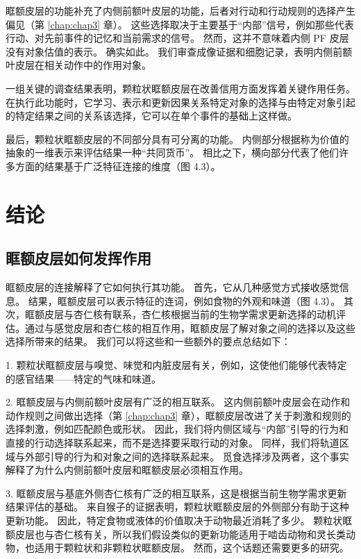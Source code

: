 眶额皮层的功能补充了内侧前额叶皮层的功能，后者对行动和行动规则的选择产生偏见（第 \ref{chap:chap3} 章）。
这些选择取决于主要基于“内部”信号，例如那些代表行动、对先前事件的记忆和当前需求的信号。
然而，这并不意味着内侧 PF 皮层没有对象估值的表示。
确实如此。 我们审查成像证据和细胞记录，表明内侧前额叶皮层在相关动作中的作用对象。\par


一组关键的调查结果表明，颗粒状眶额皮层在改善信用方面发挥着关键作用任务。
在执行此功能时，它学习、表示和更新因果关系特定对象的选择与由特定对象引起的特定结果之间的关系该选择，它可以在单个事件的基础上这样做。\par


最后，颗粒状眶额皮层的不同部分具有可分离的功能。
内侧部分根据称为价值的抽象的一维表示来评估结果一种“共同货币”。
相比之下，横向部分代表了他们许多方面的结果基于广泛特征连接的维度（图 4.3）。\par



\section{结论}

\subsection{眶额皮层如何发挥作用}

眶额皮层的连接解释了它如何执行其功能。
首先，它从几种感觉方式接收感觉信息。
结果，眶额皮层可以表示特征的连词，例如食物的外观和味道（图 4.3）。
其次，眶额皮层与杏仁核有联系，杏仁核根据当前的生物学需求更新选择的动机评估。通过与感觉皮层和杏仁核的相互作用，眶额皮层了解对象之间的选择以及这些选择所带来的结果。
我们可以将这些和一些额外的要点总结如下：\par


1. 颗粒状眶额皮层与嗅觉、味觉和内脏皮层有关，例如，这使他们能够代表特定的感官结果——特定的气味和味道。\par


2. 眶额皮层与内侧前额叶皮层有广泛的相互联系。
这内侧前额叶皮层会在动作和动作规则之间做出选择（第 \ref{chap:chap3} 章），眶额皮层改进了关于刺激和规则的选择刺激，例如匹配颜色或形状。
因此，我们将内侧区域与“内部”引导的行为和直接的行动选择联系起来，而不是选择要采取行动的对象。
同样，我们将轨道区域与外部引导的行为和对象之间的选择联系起来。
觅食选择涉及两者，这个事实解释了为什么内侧前额叶皮层和眶额皮层必须相互作用。\par


3. 眶额皮层与基底外侧杏仁核有广泛的相互联系，这是根据当前生物学需求更新结果评估的基础。
来自猴子的证据表明，颗粒状眶额皮层的外侧部分有助于这种更新功能。
因此，特定食物或液体的价值取决于动物最近消耗了多少。
颗粒状眶额皮层也与杏仁核有关，所以我们假设类似的更新功能适用于啮齿动物和灵长类动物，也适用于颗粒状和非颗粒状眶额皮层。
然而，这个话题还需要更多的研究。\par


